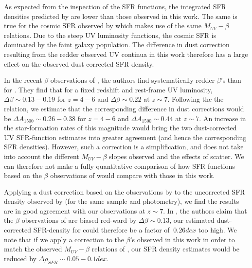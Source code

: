 As expected from the inspection of the SFR functions, the integrated SFR densities predicted by \citet{Smit:2012is} are lower than those observed in this work. The same is true for the cosmic SFR observed by \citet{2012ApJ...754...83B} which makes use of the same $M_{UV}-\beta$ relations. Due to the steep UV luminosity functions, the cosmic SFR is dominated by the faint galaxy population. The difference in dust correction resulting from the redder observed UV continua in this work therefore has a large effect on the observed dust corrected SFR density. 

In the recent $\beta$ observations of \citet{Bouwens:2013vf}, the authors find systematically redder $\beta$'s than for \citet{2012ApJ...754...83B}. They find that for a fixed redshift and rest-frame UV luminosity, $\Delta\beta \sim 0.13 - 0.19$ for $z = 4-6$ and $\Delta\beta \sim 0.22$ at $z\sim7$. Following the the \citet{Meurer:1999jm} relation, we estimate that the corresponding difference in dust corrections would be $\Delta A_{1500} \sim 0.26 - 0.38$ for $z = 4-6$ and $\Delta A_{1500} \sim 0.44$ at $z\sim7$. An increase in the \citet{Smit:2012is} star-formation rates of this magnitude would bring the two dust-corrected UV SFR-function estimates into greater agreement (and hence the corresponding SFR densities). However, such a correction is a simplification, and does not take into account the different $M_{UV}-\beta$ slopes observed and the effects of scatter. We can therefore not make a fully quantitative comparison of how SFR functions based on the $\beta$ observations of \citet{Bouwens:2013vf} would compare with those in this work.

Applying a dust correction based on the observations by \citet{Dunlop:2013kp} to the uncorrected SFR density observed by \citet{McLure:2013hh} (for the same sample and photometry), we find the results are in good agreement with our observations at $z \sim 7$. In \citet{Bouwens:2013vf}, the authors claim that the $\beta$ observations of \citet{Dunlop:2013kp} are biased red-ward by $\Delta \beta \sim 0.13$, our estimated dust-corrected SFR-density for \citet{McLure:2013hh} could therefore be a factor of $~0.26 dex$ too high. We note that if we apply a correction to the $\beta$'s observed in this work in order to match the observed $M_{UV}-\beta$ relations of \citet{Bouwens:2013vf}, our SFR density estimates would be reduced by $\Delta \rho_{SFR} \sim 0.05 - 0.1 dex$.

